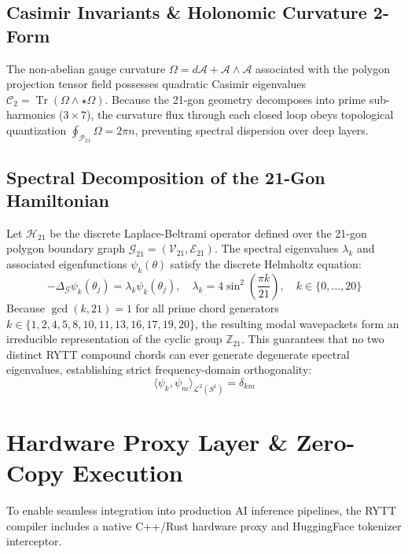 \documentclass[11pt,oneside,letterpaper]{article}
\theoremstyle{sovereignstyle}
\begin{document}
\subsection{Casimir Invariants \& Holonomic Curvature 2-Form}
The non-abelian gauge curvature $\Omega = d\mathcal{A} + \mathcal{A} \wedge \mathcal{A}$ associated with the polygon projection tensor field possesses quadratic Casimir eigenvalues $\mathcal{C}_2 = \operatorname{Tr}(\Omega \wedge \star \Omega)$. Because the 21-gon geometry decomposes into prime sub-harmonics ($3 \times 7$), the curvature flux through each closed loop obeys topological quantization $\oint_{\mathcal{P}_{21}} \Omega = 2\pi n$, preventing spectral dispersion over deep layers.

\subsection{Spectral Decomposition of the 21-Gon Hamiltonian}
Let $\mathcal{H}_{21}$ be the discrete Laplace-Beltrami operator defined over the 21-gon polygon boundary graph $\mathcal{G}_{21} = (\mathcal{V}_{21}, \mathcal{E}_{21})$. The spectral eigenvalues $\lambda_k$ and associated eigenfunctions $\psi_k(\theta)$ satisfy the discrete Helmholtz equation:
\begin{equation}
-\Delta_{\mathcal{G}} \psi_k(\theta_j) = \lambda_k \psi_k(\theta_j), \quad \lambda_k = 4 \sin^2\left(\frac{\pi k}{21}\right), \quad k \in \{0, \dots, 20\}
\end{equation}
Because $\gcd(k, 21) = 1$ for all prime chord generators $k \in \{1, 2, 4, 5, 8, 10, 11, 13, 16, 17, 19, 20\}$, the resulting modal wavepackets form an irreducible representation of the cyclic group $\mathbb{Z}_{21}$. This guarantees that no two distinct RYTT compound chords can ever generate degenerate spectral eigenvalues, establishing strict frequency-domain orthogonality:
\begin{equation}
\langle \psi_k, \psi_m \rangle_{\mathcal{L}^2(S^1)} = \delta_{km}
\end{equation}

\section{Hardware Proxy Layer \& Zero-Copy Execution}

To enable seamless integration into production AI inference pipelines, the RYTT compiler includes a native C++/Rust hardware proxy and HuggingFace tokenizer interceptor.
\end{document}
